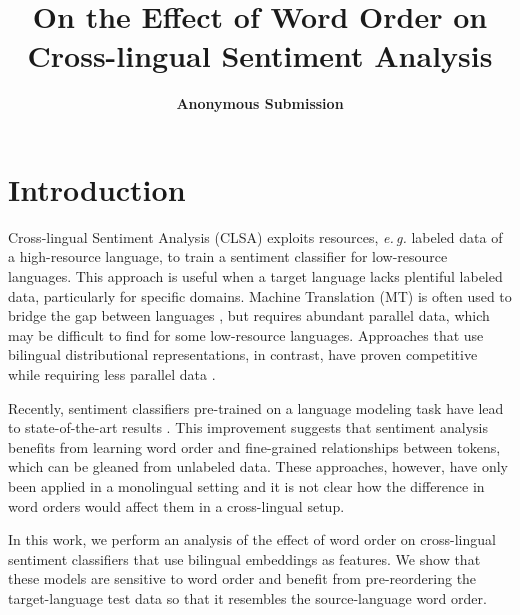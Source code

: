 \documentclass[a4paper,11pt,twocolumn,twoside]{article}
\title{On the Effect of Word Order on Cross-lingual Sentiment Analysis}
\author {\textbf{Anonymous Submission}
}
\newcommand{\eg}{\textit{e.\,g.}\xspace}
\begin{document}

\setlength\titlebox{17cm} %


\label{firstpage} \maketitle

%


\section{Introduction}


Cross-lingual Sentiment Analysis (CLSA) exploits resources, \eg labeled data of a high-resource language, to train a sentiment classifier for low-resource languages. This approach is useful when a target language lacks plentiful labeled data, particularly for specific domains. Machine Translation (MT) is often used to bridge the gap between languages \cite{Banea2008,Balahur2014d}, but requires abundant parallel data, which may be difficult to find for some low-resource languages. Approaches that use bilingual distributional representations, in contrast, have proven competitive while requiring less parallel data \cite{Chen2016,Barnes2018b}.

Recently, sentiment classifiers pre-trained on a language modeling task have lead to state-of-the-art results \cite{Peters2018,Howard2018,Devlin2018}. This improvement suggests that sentiment analysis benefits from learning word order and fine-grained relationships between tokens, which can be gleaned from unlabeled data. These approaches, however, have only been applied in a monolingual setting and it is not clear how the difference in word orders would affect them in a cross-lingual setup.

In this work, we perform an analysis of the effect of word order on cross-lingual sentiment classifiers that use bilingual embeddings as features. We show that these models are sensitive to word order and benefit from pre-reordering the target-language test data so that it resembles the source-language word order.
\end{document}
